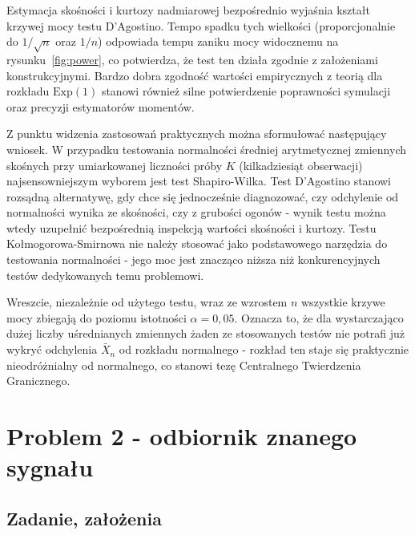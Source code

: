 \documentclass[12pt,a4paper]{article}
\begin{document}
Estymacja skośności i kurtozy nadmiarowej bezpośrednio wyjaśnia kształt krzywej mocy testu D'Agostino. Tempo spadku tych wielkości (proporcjonalnie do $1/\sqrt{n}$ oraz $1/n$) odpowiada tempu zaniku mocy widocznemu na rysunku~\ref{fig:power}, co potwierdza, że test ten działa zgodnie z założeniami konstrukcyjnymi. Bardzo dobra zgodność wartości empirycznych z teorią dla rozkładu $\mathrm{Exp}(1)$ stanowi również silne potwierdzenie poprawności symulacji oraz precyzji estymatorów momentów.

Z punktu widzenia zastosowań praktycznych można sformułować następujący wniosek. W przypadku testowania normalności średniej arytmetycznej zmiennych skośnych przy umiarkowanej liczności próby $K$ (kilkadziesiąt obserwacji) najsensowniejszym wyborem jest test Shapiro-Wilka. Test D'Agostino stanowi rozsądną alternatywę, gdy chce się jednocześnie diagnozować, czy odchylenie od normalności wynika ze skośności, czy z grubości ogonów - wynik testu można wtedy uzupełnić bezpośrednią inspekcją wartości skośności i kurtozy. Testu Kołmogorowa-Smirnowa nie należy stosować jako podstawowego narzędzia do testowania normalności - jego moc jest znacząco niższa niż konkurencyjnych testów dedykowanych temu problemowi.

Wreszcie, niezależnie od użytego testu, wraz ze wzrostem $n$ wszystkie krzywe mocy zbiegają do poziomu istotności $\alpha = 0{,}05$. Oznacza to, że dla wystarczająco dużej liczby uśrednianych zmiennych żaden ze stosowanych testów nie potrafi już wykryć odchylenia $\bar{X}_n$ od rozkładu normalnego - rozkład ten staje się praktycznie nieodróżnialny od normalnego, co stanowi tezę Centralnego Twierdzenia Granicznego.


\section{Problem 2 - odbiornik znanego sygnału}

\subsection{Zadanie, założenia}
\end{document}
